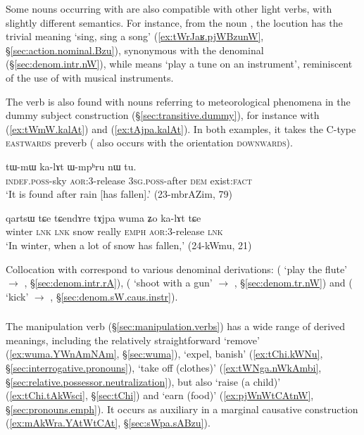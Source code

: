 Some nouns occurring with  are also compatible with other light verbs, with slightly different semantics. For instance, from the noun , the locution  has the trivial meaning `sing, sing a song' (\ref{ex:tWrJaʁ.pjWBzunW}, §\ref{sec:action.nominal.Bzu}), synonymous with the denominal   (§\ref{sec:denom.intr.nW}), while  means `play a tune on an instrument', reminiscent of the use of   with musical instruments.
  
 
 The verb   is also found with nouns referring to meteorological phenomena in the dummy subject construction (§\ref{sec:transitive.dummy}), for instance with   (\ref{ex:tWmW.kalAt})  and   (\ref{ex:tAjpa.kalAt}). In both examples, it takes the C-type  \textsc{eastwards} preverb   ( also occurs with the orientation \textsc{downwards}).

\begin{exe}
\ex \label{ex:tWmW.kalAt}
\gll  tɯ-mɯ ka-lɤt ɯ-mpʰru nɯ tu. \\
\textsc{indef}.\textsc{poss}-sky \textsc{aor}:3\flobv{}-release \textsc{3sg}.\textsc{poss}-after \textsc{dem} exist:\textsc{fact} \\
\glt `It is found after rain [has fallen].' (23-mbrAZim, 79)
\end{exe}

\begin{exe}
\ex \label{ex:tAjpa.kalAt}
\gll qartsɯ tɕe tɕendɤre tɤjpa wuma ʑo ka-lɤt tɕe \\
winter \textsc{lnk} \textsc{lnk} snow really \textsc{emph} \textsc{aor}:3\flobv{}-release \textsc{lnk} \\
\glt `In winter, when a lot of snow has fallen,' (24-kWmu, 21)
\end{exe}

Collocation with  correspond to various denominal derivations:  ( `play the flute' $\rightarrow$ , §\ref{sec:denom.intr.rA}),  ( `shoot with a gun' $\rightarrow$ , §\ref{sec:denom.tr.nW}) and  ( `kick'  $\rightarrow$ , §\ref{sec:denom.sW.caus.instr}).

\subsubsection{ } \label{sec:tCAt.lv}
The manipulation verb  (§\ref{sec:manipulation.verbs}) has a wide range of derived meanings, including the relatively straightforward `remove' (\ref{ex:wuma.YWnAmNAm}, §\ref{sec:wuma}), `expel, banish' (\ref{ex:tChi.kWNu}, §\ref{sec:interrogative.pronouns}), `take off (clothes)' (\ref{ex:tWNga.nWkAmbi}, §\ref{sec:relative.possessor.neutralization}), but also `raise (a child)' (\ref{ex:tChi.tAkWsci}, §\ref{sec:tChi}) and `earn (food)' (\ref{ex:pjWnWtCAtnW}, §\ref{sec:pronouns.emph}). It occurs as auxiliary in a marginal causative construction (\ref{ex:mAkWra.YAtWtCAt}, §\ref{sec:sWpa.sABzu}).

